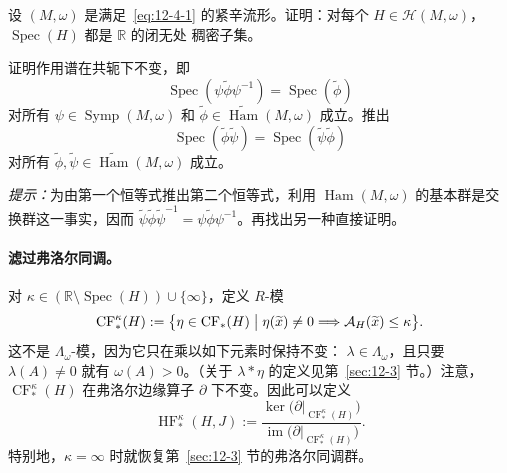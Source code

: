 \begin{exercise}\label{ex:12-4-1}
设 $(M,\omega)$ 是满足~\eqref{eq:12-4-1} 的紧辛流形。证明：对每个
$H\in\mathcal H(M,\omega)$，$\operatorname{Spec}(H)$ 都是 $\mathbb R$ 的闭无处
稠密子集。
\end{exercise}

\begin{exercise}\label{ex:12-4-2}
证明作用谱在共轭下不变，即
\[
  \operatorname{Spec}(\psi\widetilde\phi\psi^{-1})
  =\operatorname{Spec}(\widetilde\phi)
\]
对所有 $\psi\in\operatorname{Symp}(M,\omega)$ 和
$\widetilde\phi\in\widetilde{\operatorname{Ham}}(M,\omega)$ 成立。推出
\[
  \operatorname{Spec}(\widetilde\phi\widetilde\psi)
  =\operatorname{Spec}(\widetilde\psi\widetilde\phi)
\]
对所有 $\widetilde\phi,\widetilde\psi\in
\widetilde{\operatorname{Ham}}(M,\omega)$ 成立。

\emph{提示：}为由第一个恒等式推出第二个恒等式，利用
$\operatorname{Ham}(M,\omega)$ 的基本群是交换群这一事实，因而
$\widetilde\psi\widetilde\phi\widetilde\psi^{-1}
=\psi\widetilde\phi\psi^{-1}$。再找出另一种直接证明。
\end{exercise}

\paragraph{滤过弗洛尔同调。}
对 $\kappa\in(\mathbb R\setminus\operatorname{Spec}(H))\cup\{\infty\}$，定义
$R$-模
\[
  \operatorname{CF}_*^\kappa(H)
  :=\bigl\{\eta\in\operatorname{CF}_*(H)\bigm|
  \eta(\widetilde x)\ne0\Longrightarrow
  \mathcal A_H(\widetilde x)\le\kappa\bigr\}.
\]
这不是 $\Lambda_\omega$-模，因为它只在乘以如下元素时保持不变：
$\lambda\in\Lambda_\omega$，且只要 $\lambda(A)\ne0$ 就有 $\omega(A)>0$。（关于
$\lambda*\eta$ 的定义见第~\ref{sec:12-3} 节。）注意，
$\operatorname{CF}_*^\kappa(H)$ 在弗洛尔边缘算子 $\partial$ 下不变。因此可以定义
\[
  \operatorname{HF}_*^\kappa(H,J)
  :=\frac{\ker\bigl(\partial|_{\operatorname{CF}_*^\kappa(H)}\bigr)}
  {\operatorname{im}\bigl(\partial|_{\operatorname{CF}_*^\kappa(H)}\bigr)}.
\]
特别地，$\kappa=\infty$ 时就恢复第~\ref{sec:12-3} 节的弗洛尔同调群。

